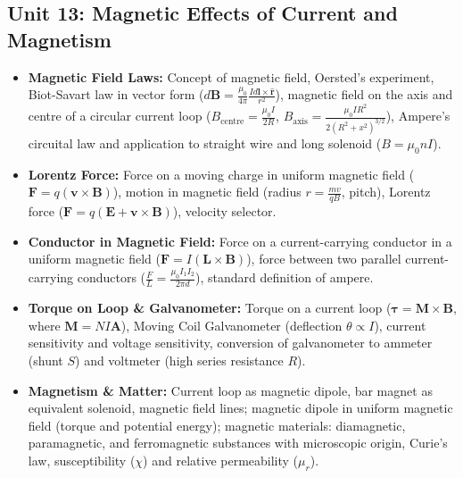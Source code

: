 \documentclass[11pt,a4paper]{article}
\begin{document}
\subsection{Unit 13: Magnetic Effects of Current and Magnetism}
\begin{itemize}
  \item \textbf{Magnetic Field Laws:} Concept of magnetic field, Oersted's experiment, Biot-Savart law in vector form ($d\mathbf{B} = \frac{\mu_0}{4\pi}\frac{I d\mathbf{l}\times\hat{\mathbf{r}}}{r^2}$), magnetic field on the axis and centre of a circular current loop ($B_{\text{centre}} = \frac{\mu_0 I}{2R}$, $B_{\text{axis}} = \frac{\mu_0 I R^2}{2(R^2+x^2)^{3/2}}$), Ampere's circuital law and application to straight wire and long solenoid ($B = \mu_0 n I$).
  \item \textbf{Lorentz Force:} Force on a moving charge in uniform magnetic field ($\mathbf{F} = q(\mathbf{v}\times\mathbf{B})$), motion in magnetic field (radius $r = \frac{mv}{qB}$, pitch), Lorentz force ($\mathbf{F} = q(\mathbf{E} + \mathbf{v}\times\mathbf{B})$), velocity selector.
  \item \textbf{Conductor in Magnetic Field:} Force on a current-carrying conductor in a uniform magnetic field ($\mathbf{F} = I(\mathbf{L}\times\mathbf{B})$), force between two parallel current-carrying conductors ($\frac{F}{L} = \frac{\mu_0 I_1 I_2}{2\pi d}$), standard definition of ampere.
  \item \textbf{Torque on Loop \& Galvanometer:} Torque on a current loop ($\boldsymbol{\tau} = \mathbf{M}\times\mathbf{B}$, where $\mathbf{M} = NI\mathbf{A}$), Moving Coil Galvanometer (deflection $\theta \propto I$), current sensitivity and voltage sensitivity, conversion of galvanometer to ammeter (shunt $S$) and voltmeter (high series resistance $R$).
  \item \textbf{Magnetism \& Matter:} Current loop as magnetic dipole, bar magnet as equivalent solenoid, magnetic field lines; magnetic dipole in uniform magnetic field (torque and potential energy); magnetic materials: diamagnetic, paramagnetic, and ferromagnetic substances with microscopic origin, Curie's law, susceptibility ($\chi$) and relative permeability ($\mu_r$).
\end{itemize}
\end{document}
